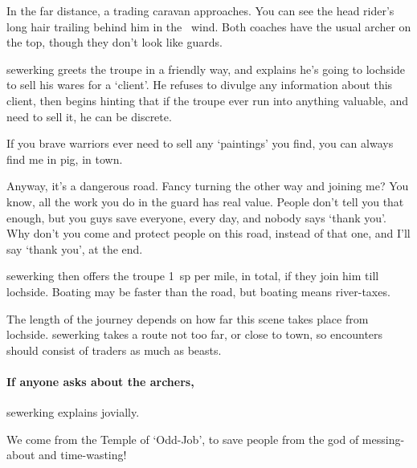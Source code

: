 \begin{boxtext}
  In the far distance, a trading caravan approaches.
  You can see the head rider's long hair trailing behind him in the \showTemperature\ wind.
  Both coaches have the usual archer on the top, though they don't look like \glspl{guard}.
\end{boxtext}

\setcounter{wounds}{2}

\sewerking

\Gls{sewerking} greets the troupe in a friendly way, and explains he's going to \gls{lochside} to sell his wares for a `client'.
He refuses to divulge any information about this client, then begins hinting that if the troupe ever run into anything valuable, and need to sell it, he can be discrete.


\null
\begin{speechtext}
  If you brave warriors ever need to sell any `paintings' you find, you can always find me in \gls{pig}, in \gls{town}.

  Anyway, it's a dangerous road.
  Fancy turning the other way and joining me?
  You know, all the work you do in the \gls{guard} has real value.
  People don't tell you that enough, but you guys save everyone, every day, and nobody says `thank you'.
  Why don't you come and protect people on this road, instead of that one, and I'll say `thank you', at the end.
\end{speechtext}

\Gls{sewerking} then offers the troupe 1~\gls{sp} per mile, in total, if they join him till \gls{lochside}.
Boating may be faster than the road, but boating means river-taxes.

The length of the journey depends on how far this scene takes place from \gls{lochside}.
\Gls{sewerking} takes a route not too far, or close to town, so encounters should consist of traders as much as beasts.

\paragraph{If anyone asks about the archers,}
\gls{sewerking} explains jovially.

\null
\begin{speechtext}
  We come from the Temple of `Odd-Job', to save people from the god of messing-about and time-wasting!
\end{speechtext}

